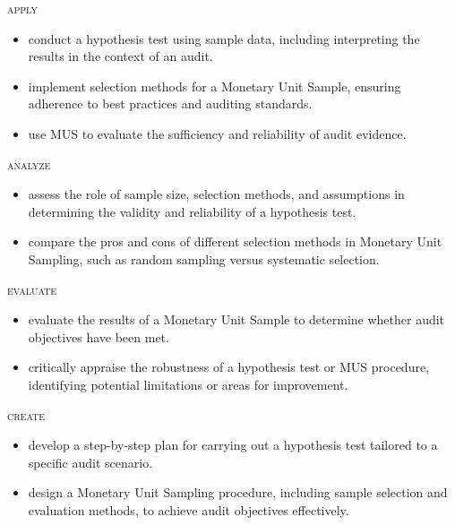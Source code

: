 \noindent \textsc{apply}
\begin{itemize}

\item conduct a hypothesis test using sample data, including interpreting the results in the context of an audit.
\item implement selection methods for a Monetary Unit Sample, ensuring adherence to best practices and auditing standards.
\item use MUS to evaluate the sufficiency and reliability of audit evidence.
\end{itemize}

\noindent \textsc{analyze}
\begin{itemize}

\item assess the role of sample size, selection methods, and assumptions in determining the validity and reliability of a hypothesis test.
\item compare the pros and cons of different selection methods in Monetary Unit Sampling, such as random sampling versus systematic selection.
\end{itemize}

\noindent \textsc{evaluate}
\begin{itemize}

\item evaluate the results of a Monetary Unit Sample to determine whether audit objectives have been met.
\item critically appraise the robustness of a hypothesis test or MUS procedure, identifying potential limitations or areas for improvement.
\end{itemize}

\noindent \textsc{create}
\begin{itemize}

\item develop a step-by-step plan for carrying out a hypothesis test tailored to a specific audit scenario.
\item design a Monetary Unit Sampling procedure, including sample selection and evaluation methods, to achieve audit objectives effectively.

\end{itemize}

